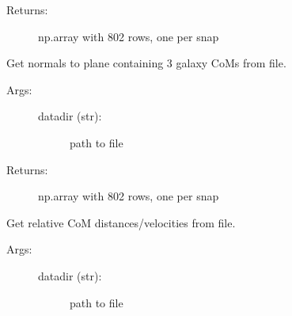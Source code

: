 \documentclass[letterpaper,10pt,english]{sphinxmanual}
\begin{document}
\begin{fulllineitems}
\begin{fulllineitems}
\begin{description}
\begin{description}
\end{description}

\item[{Returns:}] \leavevmode
np.array with 802 rows, one per snap

\end{description}

\end{fulllineitems}


\begin{fulllineitems}
\label{\detokenize{timecourse:galaxy.timecourse.TimeCourse.read_normals_file}}
Get normals to plane containing 3 galaxy CoMs from file.
\begin{description}
\item[{Args:}] \leavevmode\begin{description}
\item[{datadir (str):}] \leavevmode
path to file

\end{description}

\item[{Returns:}] \leavevmode
np.array with 802 rows, one per snap

\end{description}

\end{fulllineitems}


\begin{fulllineitems}
\label{\detokenize{timecourse:galaxy.timecourse.TimeCourse.read_relmotion_file}}
Get relative CoM distances/velocities from file.
\begin{description}
\item[{Args:}] \leavevmode\begin{description}
\item[{datadir (str):}] \leavevmode
path to file

\end{description}


\end{description}
\end{fulllineitems}
\end{fulllineitems}
\end{document}

